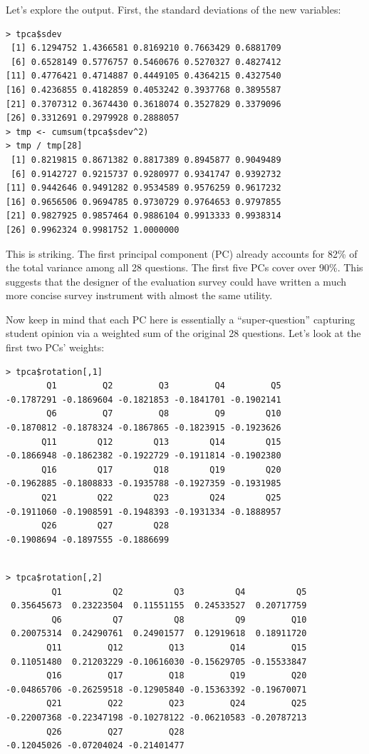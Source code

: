 Let's explore the output.  First, the standard deviations of the new
variables:

\begin{lstlisting}
> tpca$sdev
 [1] 6.1294752 1.4366581 0.8169210 0.7663429 0.6881709
 [6] 0.6528149 0.5776757 0.5460676 0.5270327 0.4827412
[11] 0.4776421 0.4714887 0.4449105 0.4364215 0.4327540
[16] 0.4236855 0.4182859 0.4053242 0.3937768 0.3895587
[21] 0.3707312 0.3674430 0.3618074 0.3527829 0.3379096
[26] 0.3312691 0.2979928 0.2888057
> tmp <- cumsum(tpca$sdev^2)
> tmp / tmp[28]
 [1] 0.8219815 0.8671382 0.8817389 0.8945877 0.9049489
 [6] 0.9142727 0.9215737 0.9280977 0.9341747 0.9392732
[11] 0.9442646 0.9491282 0.9534589 0.9576259 0.9617232
[16] 0.9656506 0.9694785 0.9730729 0.9764653 0.9797855
[21] 0.9827925 0.9857464 0.9886104 0.9913333 0.9938314
[26] 0.9962324 0.9981752 1.0000000
\end{lstlisting}

This is striking.  The first principal component (PC) already accounts
for 82\% of the total variance among all 28 questions.  The first five
PCs cover over 90\%.  This suggests that the designer of the evaluation
survey could have written a much more concise survey instrument with
almost the same utility.

Now keep in mind that each PC here is essentially a ``super-question''
capturing student opinion via a weighted sum of the original 28
questions.  Let's look at the first two PCs' weights:

\begin{lstlisting}
> tpca$rotation[,1]
        Q1         Q2         Q3         Q4         Q5 
-0.1787291 -0.1869604 -0.1821853 -0.1841701 -0.1902141 
        Q6         Q7         Q8         Q9        Q10 
-0.1870812 -0.1878324 -0.1867865 -0.1823915 -0.1923626 
       Q11        Q12        Q13        Q14        Q15 
-0.1866948 -0.1862382 -0.1922729 -0.1911814 -0.1902380 
       Q16        Q17        Q18        Q19        Q20 
-0.1962885 -0.1808833 -0.1935788 -0.1927359 -0.1931985 
       Q21        Q22        Q23        Q24        Q25 
-0.1911060 -0.1908591 -0.1948393 -0.1931334 -0.1888957 
       Q26        Q27        Q28 
-0.1908694 -0.1897555 -0.1886699 
\end{lstlisting}

\begin{lstlisting}

> tpca$rotation[,2]
         Q1          Q2          Q3          Q4          Q5 
 0.35645673  0.23223504  0.11551155  0.24533527  0.20717759 
         Q6          Q7          Q8          Q9         Q10 
 0.20075314  0.24290761  0.24901577  0.12919618  0.18911720 
        Q11         Q12         Q13         Q14         Q15 
 0.11051480  0.21203229 -0.10616030 -0.15629705 -0.15533847 
        Q16         Q17         Q18         Q19         Q20 
-0.04865706 -0.26259518 -0.12905840 -0.15363392 -0.19670071 
        Q21         Q22         Q23         Q24         Q25 
-0.22007368 -0.22347198 -0.10278122 -0.06210583 -0.20787213 
        Q26         Q27         Q28 
-0.12045026 -0.07204024 -0.21401477 
\end{lstlisting}

